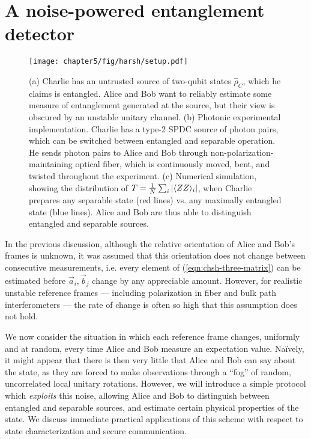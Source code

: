 \section{A noise-powered entanglement detector}
\label{sec:noisy-entanglement-witness}
\newcommand{\astate}{\hat{\rho}_C}
\newcommand{\bstate}{\hat{\rho}_{AB}}
\newcommand{\ameas}{\hat{A}}
\newcommand{\bmeas}{\hat{B}}

\begin{figure}[t!]
\centering
\texttt{[image: chapter5/fig/harsh/setup.pdf]}
\caption[A noise-powered entanglement detector]{(a) Charlie has an untrusted source of two-qubit states $\astate$, which he claims is entangled. Alice and Bob want to reliably estimate some measure of entanglement generated at the source, but their view is obscured by an unstable unitary channel.  
(b) Photonic experimental implementation. Charlie has a type-2 SPDC source of photon pairs, which can be switched between entangled and separable operation. He sends photon pairs to Alice and Bob through non-polarization-maintaining optical fiber, which is continuously moved, bent, and twisted throughout the experiment.
(c) Numerical simulation, showing the distribution of $T=\frac{1}{N}\sum_i |\langle ZZ \rangle_i| $, when Charlie prepares any separable state (red lines) vs. any maximally entangled state (blue lines). Alice and Bob are thus able to distinguish entangled and separable sources. 
\label{fig:harsh-noise-setup}
}
\end{figure}


In the previous discussion, although the relative orientation of Alice and Bob's frames is unknown, it was assumed that this orientation does not change between consecutive measurements, i.e. every element of (\ref{eqn:chsh-three-matrix}) can be estimated before $\vec{a}_i, \vec{b}_j$ change by any appreciable amount.  However, for realistic unstable reference frames --- including polarization in fiber and bulk path interferometers --- the rate of change is often so high that this assumption does not hold.  

We now consider the situation in which each reference frame changes, uniformly and at random, every time Alice and Bob measure an expectation value. Na\"ively, it might appear that there is then very little that Alice and Bob can say about the state, as they are forced to make observations through a ``fog'' of random, uncorrelated local unitary rotations. However, we will introduce a simple protocol which \emph{exploits} this noise, allowing Alice and Bob to distinguish between entangled and separable sources, and estimate certain physical properties of the state. We discuss immediate practical applications of this scheme with respect to state characterization and secure communication.

